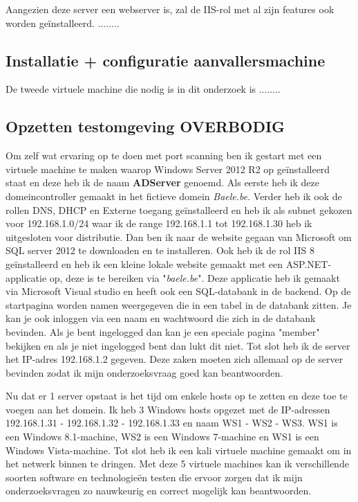 \documentclass[pdftex,a4paper,12pt]{report}
\begin{document}
Aangezien deze server een webserver is, zal de IIS-rol met al zijn features ook worden geïnstalleerd. ........

\subsection{Installatie + configuratie aanvallersmachine}
De tweede virtuele machine die nodig is in dit onderzoek is ........



\subsection{Opzetten testomgeving OVERBODIG}
Om zelf wat ervaring op te doen met port scanning ben ik gestart met een virtuele machine te maken waarop Windows Server 2012 R2 op geïnstalleerd staat en deze heb ik de naam \textbf{ADServer} genoemd. Als eerste heb ik deze domeincontroller gemaakt in het fictieve domein \textit{Baele.be}. Verder heb ik ook de rollen DNS, DHCP en Externe toegang geïnstalleerd en heb ik als subnet gekozen voor 192.168.1.0/24 waar ik de range 192.168.1.1 tot 192.168.1.30 heb ik uitgesloten voor distributie. Dan ben ik naar de website gegaan van Microsoft om SQL server 2012 te downloaden en te installeren. Ook heb ik de rol IIS 8 geïnstalleerd en heb ik een kleine lokale website gemaakt met een ASP.NET-applicatie op, deze is te bereiken via "\textit{baele.be}". Deze applicatie heb ik gemaakt via Microsoft Visual studio en heeft ook een SQL-databank in de backend. Op de startpagina worden namen weergegeven die in een tabel in de databank zitten. Je kan je ook inloggen via een naam en wachtwoord die zich in de databank bevinden. Als je bent ingelogged dan kan je een speciale pagina "member" bekijken en als je niet ingelogged bent dan lukt dit niet. Tot slot heb ik de server het IP-adres 192.168.1.2 gegeven. Deze zaken moeten zich allemaal op de server bevinden zodat ik mijn onderzoeksvraag goed kan beantwoorden. \newline

Nu dat er 1 server opstaat is het tijd om enkele hosts op te zetten en deze toe te voegen aan het domein. Ik heb 3 Windows hosts opgezet met de IP-adressen 192.168.1.31 - 192.168.1.32 - 192.168.1.33 en naam WS1 - WS2 - WS3. WS1 is een Windows 8.1-machine, WS2 is een Windows 7-machine en WS1 is een Windows Vista-machine. Tot slot heb ik een kali virtuele machine gemaakt om in het netwerk binnen te dringen. Met deze 5 virtuele machines kan ik verschillende soorten software en technologieën testen die ervoor zorgen dat ik mijn onderzoeksvragen zo nauwkeurig en correct mogelijk kan beantwoorden. 
\end{document}
